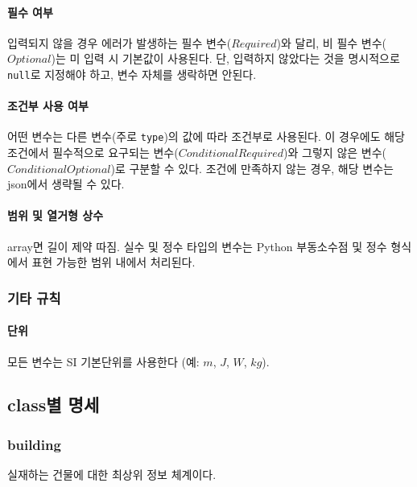 \paragraph{필수 여부} 입력되지 않을 경우 에러가 발생하는 필수 변수($Required$)와 달리, 비 필수 변수($Optional$)는 미 입력 시 기본값이 사용된다. 단, 입력하지 않았다는 것을 명시적으로 \texttt{null}로 지정해야 하고, 변수 자체를 생락하면 안된다.

\paragraph{조건부 사용 여부} 어떤 변수는 다른 변수(주로 \texttt{type})의 값에 따라 조건부로 사용된다. 이 경우에도 해당 조건에서 필수적으로 요구되는 변수($Conditional Required$)와 그렇지 않은 변수($Conditional Optional$)로 구분할 수 있다. 조건에 만족하지 않는 경우, 해당 변수는 json에서 생략될 수 있다.

\paragraph{범위 및 열거형 상수} array면 길이 제약 따짐.
실수 및 정수 타입의 변수는 Python 부동소수점 및 정수 형식에서 표현 가능한 범위 내에서 처리된다.

\subsubsection{기타 규칙}

\paragraph{단위} 모든 변수는 SI 기본단위를 사용한다 (예: $m$, $J$, $W$, $kg$).

\subsection{class별 명세}

\subsubsection{building} \label{subsection:ioref:building}
실재하는 건물에 대한 최상위 정보 체계이다.

